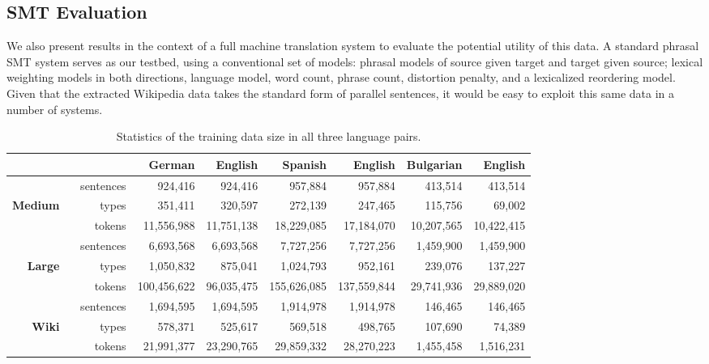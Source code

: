 \subsection{SMT Evaluation}

We also present results in the context of a full machine translation system
to evaluate the potential utility of this data.  A standard
phrasal SMT system \citep{Koehn03} serves as our testbed, using
a conventional set of models: phrasal models of source given target and
target given source; lexical weighting models in both directions, language
model, word count, phrase count, distortion penalty, and a lexicalized
reordering model.  Given that the extracted Wikipedia data takes the
standard form of parallel sentences, it would be easy to exploit this same
data in a number of systems.

\begin{table*}[ht]
\begin{center}
\begin{tabular}{|rr||r|r||r|r||r|r|}
\hline
      &                & German        & English       & Spanish       & English      & Bulgarian    & English   \\
\hline
      & sentences     & 924,416       & 924,416       & 957,884       & 957,884      & 413,514      & 413,514   \\
\textbf{Medium} \
      & types     & 351,411       & 320,597       & 272,139       & 247,465      & 115,756      & 69,002    \\
      & tokens    & 11,556,988    & 11,751,138    & 18,229,085    & 17,184,070   & 10,207,565   & 10,422,415\\
\hline
      & sentences      & 6,693,568     & 6,693,568     & 7,727,256     & 7,727,256    & 1,459,900    & 1,459,900 \\
\textbf{Large} \
      &      types     & 1,050,832     & 875,041       & 1,024,793     & 952,161      & 239,076      & 137,227   \\
      &      tokens    & 100,456,622   & 96,035,475    & 155,626,085   & 137,559,844  & 29,741,936   & 29,889,020\\
\hline
      & sentences      & 1,694,595     & 1,694,595     & 1,914,978     & 1,914,978    & 146,465      & 146,465   \\
\textbf{Wiki}  \
      &      types     & 578,371       & 525,617       & 569,518       & 498,765      & 107,690      & 74,389    \\
      &      tokens    & 21,991,377    & 23,290,765    & 29,859,332    & 28,270,223   & 1,455,458    & 1,516,231 \\
\hline
\end{tabular}
\end{center}
\caption{Statistics of the training data size in all three language pairs.}
\label{table:mtTrainStats}
\end{table*}

